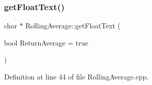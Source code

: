\mbox{\label{class_rolling_average_aab001a981060af0948bd8b46c05c8e97}} 
\subsubsection{\texorpdfstring{get\+Float\+Text()}{getFloatText()}\hspace{0.1cm}{\footnotesize\ttfamily [1/2]}}
{\footnotesize\ttfamily char $\ast$ Rolling\+Average\+::get\+Float\+Text (\begin{DoxyParamCaption}\item[{bool}]{Return\+Average = {\ttfamily true} }\end{DoxyParamCaption})}



Definition at line 44 of file Rolling\+Average.\+cpp.

